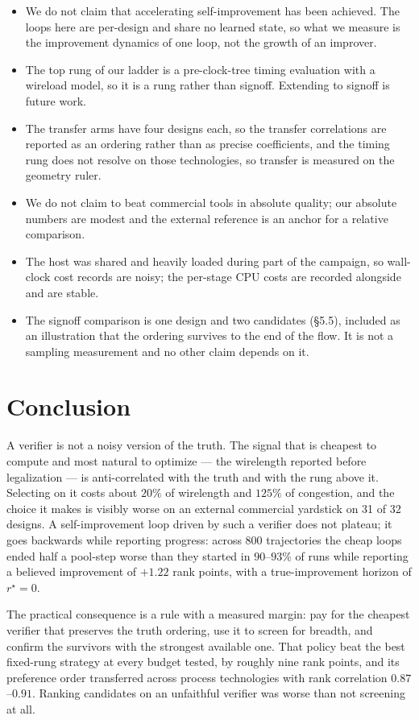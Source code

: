 \documentclass{article}
\begin{document}
\begin{itemize}
\item We do not claim that accelerating self-improvement has been achieved. The loops
here are per-design and share no learned state, so what we measure is the improvement
dynamics of one loop, not the growth of an improver.
\item The top rung of our ladder is a pre-clock-tree timing evaluation with a wireload
model, so it is a rung rather than signoff. Extending to signoff is future work.
\item The transfer arms have four designs each, so the transfer correlations are
reported as an ordering rather than as precise coefficients, and the timing rung does
not resolve on those technologies, so transfer is measured on the geometry ruler.
\item We do not claim to beat commercial tools in absolute quality; our absolute
numbers are modest and the external reference is an anchor for a relative comparison.
\item The host was shared and heavily loaded during part of the campaign, so wall-clock
cost records are noisy; the per-stage CPU costs are recorded alongside and are stable.
\item The signoff comparison is one design and two candidates (\S5.5), included as
an illustration that the ordering survives to the end of the flow. It is not a
sampling measurement and no other claim depends on it.
\end{itemize}

\section{Conclusion}

A verifier is not a noisy version of the truth. The signal that is cheapest to compute
and most natural to optimize --- the wirelength reported before legalization --- is
anti-correlated with the truth and with the rung above it. Selecting on it costs about
$20\%$ of wirelength and $125\%$ of congestion, and the choice it makes is visibly
worse on an external commercial yardstick on 31 of 32 designs. A self-improvement loop
driven by such a verifier does not plateau; it goes backwards while reporting progress:
across 800 trajectories the cheap loops ended half a pool-step worse than they started
in $90$--$93\%$ of runs while reporting a believed improvement of $+1.22$ rank points,
with a true-improvement horizon of $r^\star=0$.

The practical consequence is a rule with a measured margin: pay for the cheapest
verifier that preserves the truth ordering, use it to screen for breadth, and confirm
the survivors with the strongest available one. That policy beat the best fixed-rung
strategy at every budget tested, by roughly nine rank points, and its preference order
transferred across process technologies with rank correlation $0.87$--$0.91$. Ranking
candidates on an unfaithful verifier was worse than not screening at all.
\end{document}
